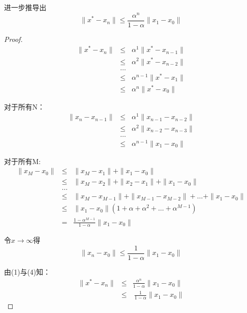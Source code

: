 \documentclass{ctexart}
\begin{document}
\begin{enumerate}
进一步推导出
\[ \| x^* - x_n\| \leq \frac{\alpha^n}{1-\alpha} \|x_1 - x_0\| \]

\begin{proof}

\begin{eqnarray}
 \| x^* - x_n\|  &\leq& \alpha^1 \|x^* - x_{n-1}\|  \nonumber \\
                     &\leq& \alpha^2 \|x^* - x_{n-2}\|    \nonumber \\
                     &\dots& \nonumber \\
                     &\leq& \alpha^{n-1} \|x^* - x_1\|    \nonumber \\
                     &\leq& \alpha^{n} \|x^* - x_0\|     
\end{eqnarray}

 对于所有N：
 \begin{eqnarray}
 \|x_n - x_{n-1}\| &\leq&  \alpha^1 \|x_{n-1} - x_{n-2}\|  \nonumber \\
                          &\leq&  \alpha^2 \|x_{n-2} - x_{n-3}\|  \nonumber \\
                          &\dots& \nonumber \\
                          &\leq&  \alpha^{n-1} \|x_1 - x_0\|  
 \end{eqnarray}
  
 对于所有M:
 \begin{eqnarray}
 \|x_M-x_0\| &\leq& \|x_M - x_1\| + \| x_1 - x_0\| \nonumber \\
                     &\leq& \|x_M - x_2\| +\|x_2 - x_1\| + \| x_1 - x_0\| \nonumber \\
                     &\dots& \nonumber \\
                      &\leq& \|x_M - x_{M-1}\| + \| x_{M-1} - x_{M-2} \| + \dots +\|x_1 -x_0\|     \nonumber \\
                      &\leq& \|x_1 - x_0\|(1+\alpha+\alpha^2+\dots +\alpha^{M-1}) \nonumber \\
                      &=& \displaystyle \frac{1-\alpha^{M-1}}{1-\alpha}\|x_1 - x_0\| 
\end{eqnarray}

令\(x\rightarrow \infty\)得
\begin{equation}
 \|x_n - x_0\| \leq  \frac{1}{1-\alpha} \|x_1 - x_0\| 
\end{equation}

由(1)与(4)知：
 \begin{eqnarray*}
\|x^*-x_n\| &\leq&  \frac{\alpha^n}{1-\alpha}\|x_1 - x_0\| \\
                  &\leq& \ \frac{1}{1-\alpha}\|x_1 - x_0\| 
\end{eqnarray*}

\end{proof}
\end{enumerate}
\end{document}
